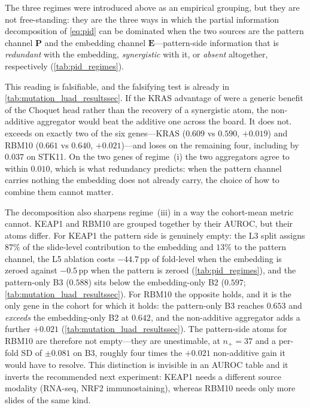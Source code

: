 The three regimes were introduced above as an empirical grouping,
but they are not free-standing: they are the three ways in which
the partial information decomposition of
\cref{eq:pid}\cite{williams2010pid,bertschinger2014unique} can be
dominated when the two sources are the pattern channel
$\mathbf{P}$ and the embedding channel $\mathbf{E}$---pattern-side
information that is \emph{redundant} with the embedding,
\emph{synergistic} with it, or \emph{absent} altogether,
respectively (\cref{tab:pid_regimes}).

\begin{table}[htbp]
\centering

\caption{The three regimes as partial-information-decomposition
atoms.
Each row states the dominant atom of \cref{eq:pid} for one gene and
the model-side signature that evidences it; all signature values
are read off \cref{tab:mutation_luad_resultssec} and the L3--L5
readouts, and no additional experiment is introduced.}
\label{tab:pid_regimes}
\end{table}

This reading is falsifiable, and the falsifying test is already in
\cref{tab:mutation_luad_resultssec}.
If the KRAS advantage of \fcmil{} were a generic benefit of the
Choquet head rather than the recovery of a synergistic atom, the
non-additive aggregator would beat the additive one across the
board.
It does not.
\fcmil{} exceeds \piabmil{} on exactly two of the six genes---KRAS
($0.609$ vs $0.590$, ${+}0.019$) and RBM10 ($0.661$ vs $0.640$,
${+}0.021$)---and loses on the remaining four, including by
$0.037$ on STK11.
On the two genes of regime~(i) the two aggregators agree to within
$0.010$, which is what redundancy predicts: when the pattern
channel carries nothing the embedding does not already carry,
the choice of how to combine them cannot matter.

The decomposition also sharpens regime~(iii) in a way the
cohort-mean metric cannot.
KEAP1 and RBM10 are grouped together by their AUROC, but their
atoms differ.
For KEAP1 the pattern side is genuinely empty: the L3 split
assigns $87\%$ of the slide-level contribution to the embedding and
$13\%$ to the pattern channel, the L5 ablation costs $-44.7$\,pp of
fold-level \auroc{} when the embedding is zeroed against $-0.5$\,pp
when the pattern is zeroed (\cref{tab:pid_regimes}), and the
pattern-only B3 ($0.588$) sits below the
embedding-only B2 ($0.597$; \cref{tab:mutation_luad_resultssec}).
For RBM10 the opposite holds, and it is the only gene in the cohort
for which it holds: the pattern-only B3 reaches $0.653$ and
\emph{exceeds} the embedding-only B2 at $0.642$, and the
non-additive aggregator adds a further ${+}0.021$
(\cref{tab:mutation_luad_resultssec}).
The pattern-side atoms for RBM10 are therefore not empty---they are
unestimable, at $n_+ = 37$ and a per-fold SD of $\pm 0.081$ on B3,
roughly four times the ${+}0.021$ non-additive gain it would have
to resolve.
This distinction is invisible in an AUROC table and it inverts the
recommended next experiment: KEAP1 needs a different source
modality (RNA-seq, NRF2 immunostaining), whereas RBM10 needs only
more slides of the same kind.

